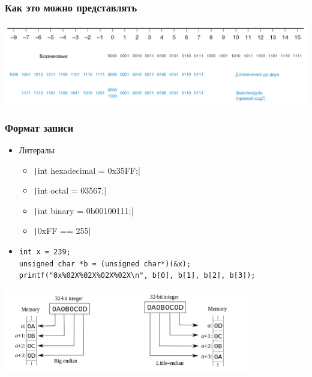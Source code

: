 \documentclass{../../slides-style}
\begin{document}
    \begin{frame}
        \frametitle{Как это можно представлять}
        \begin{center}
            \includegraphics[width=\textwidth]{integerScale.png}
        \end{center}
    \end{frame}

    \begin{frame}[fragile]
        \frametitle{Формат записи}
        \begin{itemize}
            \item Литералы
            \begin{itemize}
                \item \texttt|int hexadecimal = 0x35FF;|
                \item \texttt|int octal = 03567;|
                \item \texttt|int binary = 0b00100111;|
                \item \texttt|0xFF == 255|
            \end{itemize}
            \item 
            \begin{footnotesize}
                \begin{verbatim}
int x = 239;
unsigned char *b = (unsigned char*)(&x);
printf("0x%02X%02X%02X%02X\n", b[0], b[1], b[2], b[3]);
                \end{verbatim}
            \end{footnotesize}
        \end{itemize}
        \begin{center}
            \includegraphics[width=0.8\textwidth]{little-endian-big-endian.png}
        \end{center}
    \end{frame}
\end{document}
